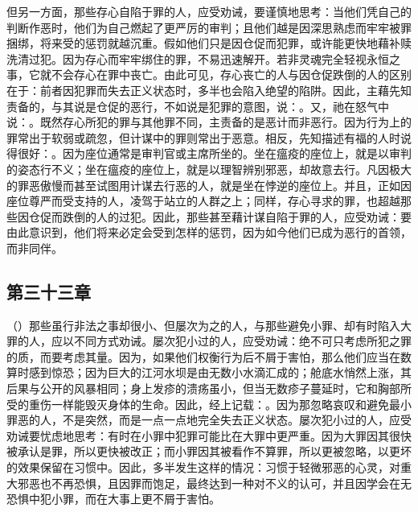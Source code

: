 但另一方面，那些存心自陷于罪的人，应受劝诫，要谨慎地思考：当他们凭自己的判断作恶时，他们为自己燃起了更严厉的审判；且他们越是因深思熟虑而牢牢被罪捆绑，将来受的惩罚就越沉重。假如他们只是因仓促而犯罪，或许能更快地藉补赎洗清过犯。因为存心而牢牢绑住的罪，不易迅速解开。若非灵魂完全轻视永恒之事，它就不会存心在罪中丧亡。由此可见，存心丧亡的人与因仓促跌倒的人的区别在于：前者因犯罪而失去正义状态时，多半也会陷入绝望的陷阱。因此，主藉先知责备的，与其说是仓促的恶行，不如说是犯罪的意图，说：。又，祂在怒气中说：。既然存心所犯的罪与其他罪不同，主责备的是恶计而非恶行。因为行为上的罪常出于软弱或疏忽，但计谋中的罪则常出于恶意。相反，先知描述有福的人时说得很好：。因为座位通常是审判官或主席所坐的。坐在瘟疫的座位上，就是以审判的姿态行不义；坐在瘟疫的座位上，就是以理智辨别邪恶，却故意去行。凡因极大的罪恶傲慢而甚至试图用计谋去行恶的人，就是坐在悖逆的座位上。并且，正如因座位尊严而受支持的人，凌驾于站立的人群之上；同样，存心寻求的罪，也超越那些因仓促而跌倒的人的过犯。因此，那些甚至藉计谋自陷于罪的人，应受劝诫：要由此意识到，他们将来必定会受到怎样的惩罚，因为如今他们已成为恶行的首领，而非同伴。\par


\subsection{第三十三章}

\par

（）那些虽行非法之事却很小、但屡次为之的人，与那些避免小罪、却有时陷入大罪的人，应以不同方式劝诫。屡次犯小过的人，应受劝诫：绝不可只考虑所犯之罪的质，而要考虑其量。因为，如果他们权衡行为后不屑于害怕，那么他们应当在数算时感到惊恐；因为巨大的江河水坝是由无数小水滴汇成的；舱底水悄然上涨，其后果与公开的风暴相同；身上发疹的溃疡虽小，但当无数疹子蔓延时，它和胸部所受的重伤一样能毁灭身体的生命。因此，经上记载：。因为那忽略哀叹和避免最小罪恶的人，不是突然，而是一点一点地完全失去正义状态。屡次犯小过的人，应受劝诫要忧虑地思考：有时在小罪中犯罪可能比在大罪中更严重。因为大罪因其很快被承认是罪，所以更快被改正；而小罪因其被看作不算罪，所以更被忽略，以更坏的效果保留在习惯中。因此，多半发生这样的情况：习惯于轻微邪恶的心灵，对重大邪恶也不再恐惧，且因罪而饱足，最终达到一种对不义的认可，并且因学会在无恐惧中犯小罪，而在大事上更不屑于害怕。\par

